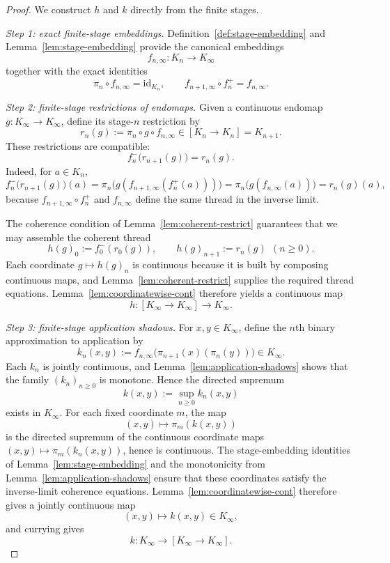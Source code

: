 \documentclass[webpdf,traditional,large,numbered]{oup-authoring-template}
\theoremstyle{thmstyleone}%
\theoremstyle{thmstyletwo}%
\theoremstyle{thmstylethree}%
\newcommand{\Kinf}{K_\infty}
\begin{document}
\begin{proof}
  We construct $h$ and $k$ directly from the finite stages.

  \smallskip
  \noindent\emph{Step 1: exact finite-stage embeddings.}
  Definition~\ref{def:stage-embedding} and
  Lemma~\ref{lem:stage-embedding} provide the canonical embeddings
  \[
    f_{n,\infty}:K_n\to\Kinf
  \]
  together with the exact identities
  \[
    \pi_n\circ f_{n,\infty}=\mathrm{id}_{K_n},
    \qquad
    f_{n+1,\infty}\circ f_n^+ = f_{n,\infty}.
  \]

  \smallskip
  \noindent\emph{Step 2: finite-stage restrictions of endomaps.}
  Given a continuous endomap $g:\Kinf\to\Kinf$, define its stage-$n$ restriction
  by
  \[
    r_n(g):=\pi_n\circ g\circ f_{n,\infty} \in [K_n\to K_n]=K_{n+1}.
  \]
  These restrictions are compatible:
  \[
    f_n^-\bigl(r_{n+1}(g)\bigr)=r_n(g).
  \]
  Indeed, for $a\in K_n$,
  \[
    f_n^-\bigl(r_{n+1}(g)\bigr)(a)
      = \pi_n\bigl(g(f_{n+1,\infty}(f_n^+(a)))\bigr)
      = \pi_n\bigl(g(f_{n,\infty}(a))\bigr)
      = r_n(g)(a),
  \]
  because $f_{n+1,\infty}\circ f_n^+$ and $f_{n,\infty}$ define the same thread
  in the inverse limit.

  The coherence condition of Lemma~\ref{lem:coherent-restrict} guarantees
  that we may assemble the coherent thread
  \[
    h(g)_0:=f_0^-(r_0(g)),\qquad h(g)_{n+1}:=r_n(g)\ \ (n\ge 0).
  \]
  Each coordinate $g\mapsto h(g)_n$ is continuous because it is built by
  composing continuous maps, and Lemma~\ref{lem:coherent-restrict} supplies the
  required thread equations.  Lemma~\ref{lem:coordinatewise-cont} therefore
  yields a continuous map
  \[
    h:[\Kinf\to\Kinf]\to\Kinf.
  \]

  \smallskip
  \noindent\emph{Step 3: finite-stage application shadows.}
  For $x,y\in\Kinf$, define the $n$th binary approximation to application by
  \[
    k_n(x,y):=f_{n,\infty}\bigl(\pi_{n+1}(x)(\pi_n(y))\bigr)\in\Kinf.
  \]
  Each $k_n$ is jointly continuous, and Lemma~\ref{lem:application-shadows}
  shows that the family $(k_n)_{n\ge 0}$ is monotone.  Hence the directed
  supremum
  \[
    k(x,y):=\sup_{n\ge 0}k_n(x,y)
  \]
  exists in $\Kinf$.  For each fixed coordinate $m$, the map
  \[
    (x,y)\longmapsto \pi_m(k(x,y))
  \]
  is the directed supremum of the continuous coordinate maps
  $(x,y)\mapsto \pi_m(k_n(x,y))$, hence is continuous.  The stage-embedding
  identities of Lemma~\ref{lem:stage-embedding} and the monotonicity from
  Lemma~\ref{lem:application-shadows} ensure that these coordinates satisfy the
  inverse-limit coherence equations.  Lemma~\ref{lem:coordinatewise-cont}
  therefore gives a jointly continuous map
  \[
    (x,y)\longmapsto k(x,y)\in\Kinf,
  \]
  and currying gives
  \[
    k:\Kinf\to[\Kinf\to\Kinf].
  \]


\end{proof}
\end{document}
